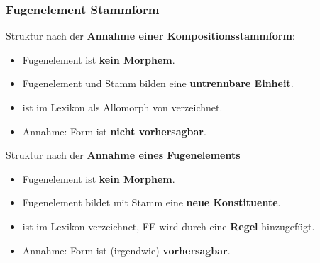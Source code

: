 \begin{frame}
\frametitle{Fugenelement \vs Stammform}

\begin{minipage}{.78\textwidth}
	
Struktur nach der \textbf{Annahme einer Kompositionsstammform}:

\begin{itemize}	
	\item Fugenelement ist \textbf{kein Morphem}.

	\item Fugenelement und Stamm bilden eine \textbf{untrennbare Einheit}.
	
	\item {} ist im Lexikon als Allomorph von  verzeichnet.
	
	\item Annahme: Form  ist \textbf{nicht vorhersagbar}.
\end{itemize}

\end{minipage}
\begin{minipage}{.21\textwidth}	
	\centering	
\end{minipage}

\begin{minipage}{.76\textwidth}

\pause 

\medskip 

Struktur nach der \textbf{Annahme eines Fugenelements}

\begin{itemize}	
	\item Fugenelement ist \textbf{kein Morphem}.
	
	\item Fugenelement bildet mit Stamm eine \textbf{neue Konstituente}.
	
	\item {} ist im Lexikon verzeichnet, FE  wird durch eine \textbf{Regel} hinzugefügt.
	
	\item Annahme: Form  ist (irgendwie) \textbf{vorhersagbar}.
\end{itemize}
	
\end{minipage}
\begin{minipage}{.23\textwidth}	
	\centering	
	\scalebox{.8}{
	\begin{forest}
		[N
		[N 
		[Kind]
		[FE
		[\alertred{-er}]
		]
		]
		[N
		[Wagen]
		]
		]		
	\end{forest}
	}
\end{minipage}

\end{frame}



